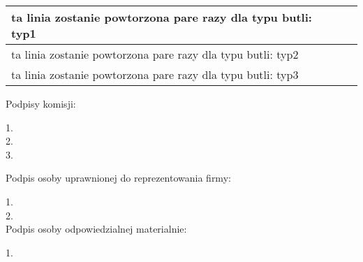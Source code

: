\documentclass[8pt]{article}
\begin{document}
\begin{center}

\begin{tabularx}{\textwidth}{| X | c |}

\hline

ta linia zostanie powtorzona pare razy dla typu butli: typ1 & \\ \hline
ta linia zostanie powtorzona pare razy dla typu butli: typ2 & \\ \hline
ta linia zostanie powtorzona pare razy dla typu butli: typ3 & \\ \hline

\end{tabularx}

\end{center}

\begin{multicols}{2}

Podpisy komisji:

1. \dotfill \\


2. \dotfill \\


3. \dotfill \\

\columnbreak

Podpis osoby uprawnionej do reprezentowania firmy:

1. \dotfill \\


2. \dotfill \\

Podpis osoby odpowiedzialnej materialnie:

1. \dotfill \\

\end{multicols}
\end{document}
